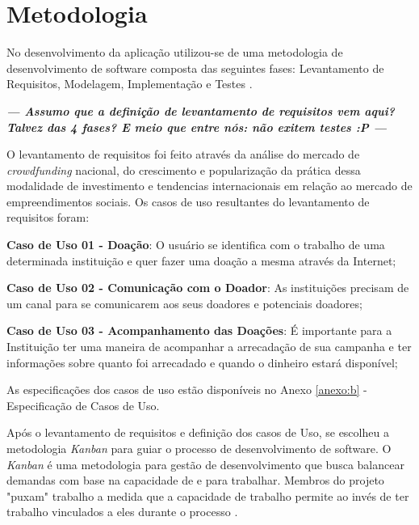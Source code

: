 \chapter{Metodologia}

No desenvolvimento da aplicação utilizou-se de uma metodologia de desenvolvimento de software composta das seguintes fases: Levantamento de Requisitos, Modelagem, Implementação e Testes \cite{sommerville2003engenharia}.

\textbf{\textit{--- Assumo que a definição de levantamento de requisitos vem aqui? Talvez das 4 fases? E meio que entre nós: não exitem testes :P ---}}

O levantamento de requisitos foi feito através da análise do mercado de \emph{crowdfunding} nacional, do crescimento e popularização da prática dessa modalidade de investimento e tendencias internacionais em relação ao mercado de empreendimentos sociais. Os casos de uso resultantes do levantamento de requisitos foram:

\begin{lista}
  \item \textbf{Caso de Uso 01 - Doação}: O usuário se identifica com o trabalho de uma determinada instituição e quer fazer uma doação a mesma através da Internet;
  \item \textbf{Caso de Uso 02 - Comunicação com o Doador}: As instituições precisam de um canal para se comunicarem aos seus doadores e potenciais doadores;
  \item \textbf{Caso de Uso 03 - Acompanhamento das Doações}: É importante para a Instituição ter uma maneira de acompanhar a arrecadação de sua campanha e ter informações sobre quanto foi arrecadado e quando o dinheiro estará disponível;
\end{lista}

As especificações dos casos de uso estão disponíveis no Anexo \ref{anexo:b} - Especificação de Casos de Uso.

Após o levantamento de requisitos e definição dos casos de Uso, se escolheu a metodologia \emph{Kanban} para guiar o processo de desenvolvimento de software. O \emph{Kanban} é uma metodologia para gestão de desenvolvimento que busca balancear demandas com base na capacidade de e para trabalhar. Membros do projeto "puxam" trabalho a medida que a capacidade de trabalho permite ao invés de ter trabalho vinculados a eles durante o processo \cite{wiki:Kanban}.

